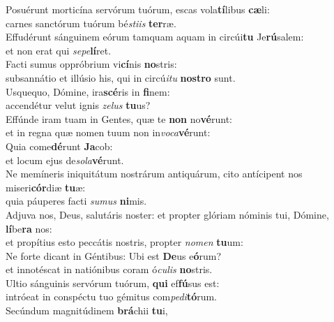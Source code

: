 \evenverse Posuérunt morticína servórum tuórum, escas vola\textbf{tí}libus \textbf{cæ}li:~\*\\
\evenverse carnes sanctórum tuórum bé\textit{sti}\textit{is} \textbf{ter}ræ.\\
\oddverse Effudérunt sánguinem eórum tamquam aquam in circúi\textbf{tu} Je\textbf{rú}salem:~\*\\
\oddverse et non erat qui \textit{se}\textit{pe}\textbf{lí}ret.\\
\evenverse Facti sumus oppróbrium vi\textbf{cí}nis \textbf{no}stris:~\*\\
\evenverse subsannátio et illúsio his, qui in circú\textit{i}\textit{tu} \textbf{no}\textbf{stro} sunt.\\
\oddverse Usquequo, Dómine, ira\textbf{scé}ris in \textbf{fi}nem:~\*\\
\oddverse accendétur velut ignis \textit{ze}\textit{lus} \textbf{tu}us?\\
\evenverse Effúnde iram tuam in Gentes, quæ te \textbf{non} no\textbf{vé}runt:~\*\\
\evenverse et in regna quæ nomen tuum non in\textit{vo}\textit{ca}\textbf{vé}runt:\\
\oddverse Quia come\textbf{dé}runt \textbf{Ja}cob:~\*\\
\oddverse et locum ejus de\textit{so}\textit{la}\textbf{vé}runt.\\
\evenverse Ne memíneris iniquitátum nostrárum antiquárum, cito antícipent nos miseri\textbf{cór}diæ \textbf{tu}æ:~\*\\
\evenverse quia páuperes facti \textit{su}\textit{mus} \textbf{ni}mis.\\
\oddverse Adjuva nos, Deus, salutáris noster: et propter glóriam nóminis tui, Dómine, \textbf{lí}be\textbf{ra} nos:~\*\\
\oddverse et propítius esto peccátis nostris, propter \textit{no}\textit{men} \textbf{tu}um:\\
\evenverse Ne forte dicant in Géntibus: Ubi est \textbf{De}us e\textbf{ó}rum?~\*\\
\evenverse et innotéscat in natiónibus coram ó\textit{cu}\textit{lis} \textbf{no}stris.\\
\oddverse Ultio sánguinis servórum tuórum, \textbf{qui} ef\textbf{fú}sus est:~\*\\
\oddverse intróeat in conspéctu tuo gémitus com\textit{pe}\textit{di}\textbf{tó}rum.\\
\evenverse Secúndum magnitúdinem \textbf{brá}chii \textbf{tu}i,~\*\\
